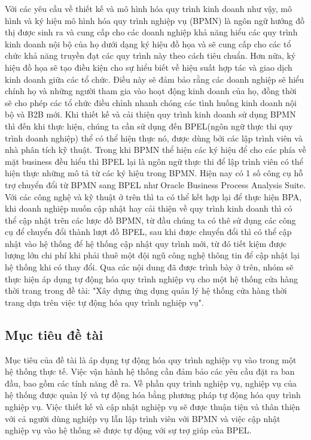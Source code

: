 Với các yêu cầu về thiết kế và mô hình hóa quy trình kinh doanh như vậy, mô hình và ký hiệu mô hình hóa quy trình nghiệp vụ (BPMN) là ngôn ngữ hướng đồ thị được sinh ra và cung cấp cho các doanh nghiệp khả năng hiểu các quy trình kinh doanh nội bộ của họ dưới dạng ký hiệu đồ họa và sẽ cung cấp cho các tổ chức khả năng truyền đạt các quy trình này theo cách tiêu chuẩn. Hơn nữa, ký hiệu đồ họa sẽ tạo điều kiện cho sự hiểu biết về hiệu suất hợp tác và giao dịch kinh doanh giữa các tổ chức. Điều này sẽ đảm bảo rằng các doanh nghiệp sẽ hiểu chính họ và những người tham gia vào hoạt động kinh doanh của họ, đồng thời sẽ cho phép các tổ chức điều chỉnh nhanh chóng các tình huống kinh doanh nội bộ và B2B mới. Khi thiết kế và cải thiện quy trình kinh doanh sử dụng BPMN thì đến khi thực hiện, chúng ta cần sử dụng đến BPEL(ngôn ngữ thực thi quy trình doanh nghiệp) thể có thể hiện thực nó, được dùng bởi các lập trình viên và nhà phân tích kỹ thuật. Trong khi BPMN thể hiện các ký hiệu để cho các phía về mặt business đều hiểu thì BPEL lại là ngôn ngữ thực thi để lập trình viên có thể hiện thực những mô tả từ các ký hiệu trong BPMN. Hiện nay có 1 số công cụ hỗ trợ chuyển đổi từ BPMN sang BPEL như Oracle Business Process Analysis Suite. Với các công nghệ và kỹ thuật ở trên thì ta có thể kết hợp lại để thực hiện BPA, khi doanh nghiệp muốn cập nhật hay cải thiện về quy trình kinh doanh thì có thể cập nhật trên các lược đồ BPMN, từ đầu chúng ta có thê sử dụng các công cụ để chuyển đổi thành lượt đồ BPEL, sau khi được chuyển đổi thì có thể cập nhật vào hệ thống để hệ thống cập nhật quy trình mới, từ đó tiết kiệm được lượng lớn chi phí khi phải thuê một đội ngũ công nghệ thông tin để cập nhật lại hệ thống khi có thay đổi. Qua các nội dung đã được trình bày ở trên, nhóm sẽ thực hiện áp dụng tự động hóa quy trình nghiệp vụ cho một hệ thống cửa hàng thời trang trong đề tài: "Xây dựng ứng dụng quản lý hệ thống cửa hàng thời trang dựa trên việc tự động hóa quy trình nghiệp vụ".\\


\subsection{Mục tiêu đề tài}
\hspace{0.5cm} Mục tiêu của đề tài là áp dụng tự động hóa quy trình nghiệp vụ vào trong một hệ thống thực tế. Việc vận hành hệ thống cần đảm bảo các yêu cầu đặt ra ban đầu, bao gồm các tính năng đề ra. Về phần quy trình nghiệp vụ, nghiệp vụ của hệ thống được quản lý và tự động hóa bằng phương pháp tự động hóa quy trình nghiệp vụ. Việc thiết kế và cập nhật nghiệp vụ sẽ được thuận tiện và thân thiện với cả người dùng nghiệp vụ lẫn lập trình viên với BPMN và việc cập nhật nghiệp vụ vào hệ thống sẽ được tự động với sự trợ giúp của BPEL.

